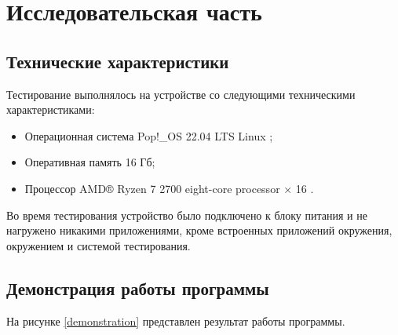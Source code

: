 \chapter{Исследовательская часть}
\section{Технические характеристики}
Тестирование выполнялось на устройстве со следующими техническими характеристиками:
\begin{itemize}
	\item Операционная система Pop!\_OS 22.04 LTS \cite{ubuntu} Linux \cite{linux};
	\item Оперативная память 16 Гб;
	\item Процессор AMD® Ryzen 7 2700 eight-core processor × 16 \cite{amd}.
\end{itemize}
Во время тестирования устройство было подключено к блоку питания и не нагружено никакими приложениями, кроме встроенных приложений окружения, окружением и системой тестирования.

\section{Демонстрация работы программы}



На рисунке \ref{demonstration} представлен результат работы программы.

